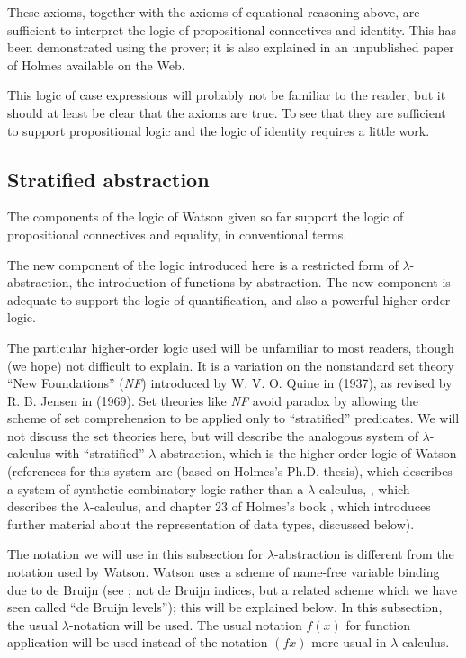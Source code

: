 \documentclass{kluwer}
\begin{document}
\begin{article}
\begin{description}
\end{description}

These axioms, together with the axioms of equational reasoning above,
are sufficient to interpret the logic of propositional connectives and
identity.  This has been demonstrated using the prover; it is also
explained in an unpublished paper \cite{eft} of Holmes available on
the Web.

This logic of case expressions will probably not be familiar to the
reader, but it should at least be clear that the axioms are true.  To
see that they are sufficient to support propositional logic and the
logic of identity requires a little work.

\subsection {Stratified abstraction}

The components of the logic of Watson given so far support the logic
of propositional connectives and equality, in conventional terms.

The new component of the logic introduced here is a restricted form of
$\lambda$-abstraction, the introduction of functions by abstraction.
The new component is adequate to support the logic of quantification,
and also a powerful higher-order logic.

The particular higher-order logic used will be unfamiliar to most
readers, though (we hope) not difficult to explain.  It is a variation
on the nonstandard set theory ``New Foundations'' ({\em NF\/})
introduced by W. V. O. Quine in \cite{nf} (1937), as revised by
R. B. Jensen in \cite{nfu} (1969).  Set theories like {\em NF\/} avoid
paradox by allowing the scheme of set comprehension to be applied only
to ``stratified'' predicates.  We will not discuss the set theories
here, but will describe the analogous system of $\lambda$-calculus
with ``stratified'' $\lambda$-abstraction, which is the higher-order
logic of Watson (references for this system are \cite{trc} (based on
Holmes's Ph.D. thesis), which describes a system of synthetic
combinatory logic rather than a $\lambda$-calculus, \cite{stratified},
which describes the $\lambda$-calculus, and chapter 23 of Holmes's
book \cite{textbook}, which introduces further material about the
representation of data types, discussed below).

The notation we will use in this subsection for $\lambda$-abstraction
is different from the notation used by Watson.  Watson uses a scheme
of name-free variable binding due to de Bruijn (see \cite{debruijn};
not de Bruijn indices, but a related scheme which we have seen called
``de Bruijn levels''); this will be explained below.  In this
subsection, the usual $\lambda$-notation will be used.  The usual
notation $f(x)$ for function application will be used instead of the
notation $(fx)$ more usual in $\lambda$-calculus.


\end{article}
\end{document}
